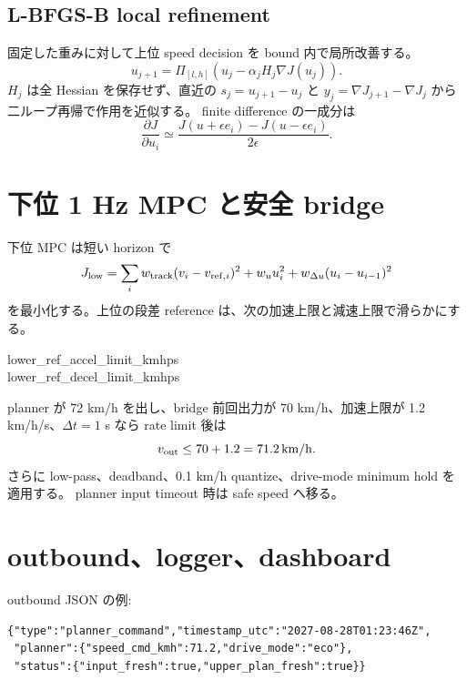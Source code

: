 \subsection{L-BFGS-B local refinement}
固定した重みに対して上位 speed decision を bound 内で局所改善する。
\[
 u_{j+1}=\Pi_{[l,h]}\left(u_j-\alpha_jH_j\nabla J(u_j)\right).
\]
$H_j$ は全 Hessian を保存せず、直近の
$s_j=u_{j+1}-u_j$ と $y_j=\nabla J_{j+1}-\nabla J_j$ から二ループ再帰で作用を近似する。
finite difference の一成分は
\[
 \frac{\partial J}{\partial u_i}\simeq
 \frac{J(u+\epsilon e_i)-J(u-\epsilon e_i)}{2\epsilon}.
\]



\section{下位 1 Hz MPC と安全 bridge}
下位 MPC は短い horizon で
\[
 J_{\rm low}=\sum_i w_{\rm track}(v_i-v_{{\rm ref},i})^2
 +w_u u_i^2+w_{\Delta u}(u_i-u_{i-1})^2
\]
を最小化する。上位の段差 reference は、次の加速上限と減速上限で滑らかにする。
\begin{center}\small\ttfamily
lower\_ref\_accel\_limit\_kmhps\\
lower\_ref\_decel\_limit\_kmhps
\end{center}

planner が 72 km/h を出し、bridge 前回出力が 70 km/h、加速上限が
1.2 km/h/s、$\Delta t=1$ s なら rate limit 後は
\[
 v_{\rm out}\le70+1.2=71.2\,{\rm km/h}.
\]
さらに low-pass、deadband、0.1 km/h quantize、drive-mode minimum hold を適用する。
planner input timeout 時は safe speed へ移る。


\section{outbound、logger、dashboard}
outbound JSON の例:
\begin{lstlisting}
{"type":"planner_command","timestamp_utc":"2027-08-28T01:23:46Z",
 "planner":{"speed_cmd_kmh":71.2,"drive_mode":"eco"},
 "status":{"input_fresh":true,"upper_plan_fresh":true}}
\end{lstlisting}

